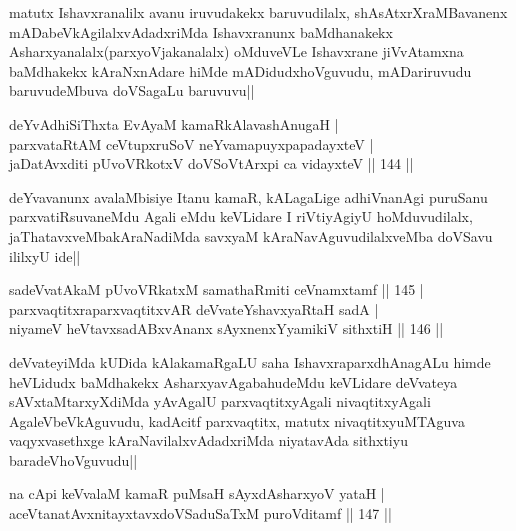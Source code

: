 \begin{artha}
matutx Ishavxranalilx avanu iruvudakekx baruvudilalx, shAsAtxrXraMBavanenx mADabeVkAgilalxvAdadxriMda Ishavxranunx baMdhanakekx Asharxyanalalx(parxyoVjakanalalx) oMduveVLe Ishavxrane jiVvAtamxna baMdhakekx kAraNxnAdare hiMde mADidudxhoVguvudu, mADariruvudu baruvudeMbuva doVSagaLu baruvuvu||
\end{artha}


\begin{shl}
deYvAdhiSiThxta EvAyaM kamaRkAlavashAnugaH |\\
parxvataRtAM ceVtupxruSoV neYvamapuyxpapadayxteV |\\
jaDatAvxditi pUvoVRkotxV doVSoV\s tArxpi ca vidayxteV \hfill || 144 ||
\end{shl}

\begin{artha}
deYvavanunx avalaMbisiye Itanu kamaR, kALagaLige adhiVnanAgi puruSanu parxvatiRsuvaneMdu Agali eMdu keVLidare I riVtiyAgiyU hoMduvudilalx, jaThatavxveMbakAraNadiMda savxyaM kAraNavAguvudilalxveMba doVSavu ililxyU ide||
\end{artha}


\begin{shl}
sadeVvatAkaM pUvoVRkatxM samathaRmiti ceVnamxtamf \hfill || 145 |\\
parxvaqtitxraparxvaqtitxvAR deVvateYshavxyaRtaH sadA |\\
niyameV heVtavxsadABxvAnanx sAyxnenxYyamikiV sithxtiH \hfill || 146 ||
\end{shl}

\begin{artha}
deVvateyiMda kUDida kAlakamaRgaLU saha IshavxraparxdhAnagALu himde heVLidudx baMdhakekx AsharxyavAgabahudeMdu keVLidare deVvateya sAVxtaMtarxyXdiMda yAvAgalU parxvaqtitxyAgali nivaqtitxyAgali AgaleVbeVkAguvudu, kadAcitf parxvaqtitx, matutx nivaqtitxyuMTAguva vaqyxvasethxge kAraNavilalxvAdadxriMda niyatavAda sithxtiyu baradeVhoVguvudu||
\end{artha}


\begin{shl}
na cApi keVvalaM kamaR puMsaH sAyxdAsharxyoV yataH |\\
aceVtanatAvxnitayxtavxdoVSaduSaTxM puroVditamf \hfill || 147 ||
\end{shl}


